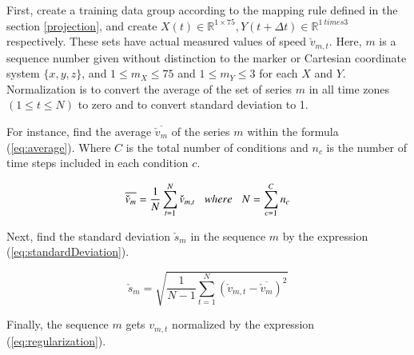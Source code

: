 \documentclass{sigchi}
\begin{document}
First, create a training data group according to the mapping rule defined in the section \ref{projection}, and create $ X (t) \in \mathbb {R} ^ {1 \times 75}, Y (t + \Delta t) \in \mathbb {R} ^ {1 \ times 3} $ respectively. These sets have actual measured values of speed $ \check {v}_{m, t} $. Here, $ m $ is a sequence number given without distinction to the marker or Cartesian coordinate system $ \{x, y, z \} $, and $ 1 \leq m_X \leq 75$ and $ 1 \leq m_Y \leq 3 $ for each $ X $ and $ Y $. Normalization is to convert the average of the set of series $ m $ in all time zones $ (1 \leq t \leq N) $ to zero and to convert standard deviation to 1.

For instance, find the average $ \overline {\check {v}_{m}} $ of the series $ m $ within the formula (\ref{eq:average}). Where $ C $ is the total number of conditions and $ n_c $ is the number of time steps included in each condition $ c $.

\begin{equation}
\overline{\check{v}_{m}} = \frac{1}{N}\sum^{N}_{t=1}\check{v}_{m,t} 
 \hspace{3mm} where  \hspace{3mm}
N=\sum^{C}_{c=1} n_c 
\label{eq:average}
\end{equation}

Next, find the standard deviation $ \check {s}_m $ in the sequence $ m $ by the expression (\ref{eq:standardDeviation}).

\begin{equation}
  \check{s}_m = \sqrt{ \frac{1}{N-1}\sum^{N}_{t=1} ( \check{v}_{m,t} - \overline{\check{v}_m} ) ^2} 			
\label{eq:standardDeviation}
\end{equation}

Finally, the sequence $ m $ gets $ v_{m, t} $ normalized by the expression (\ref{eq:regularization}).
\end{document}
